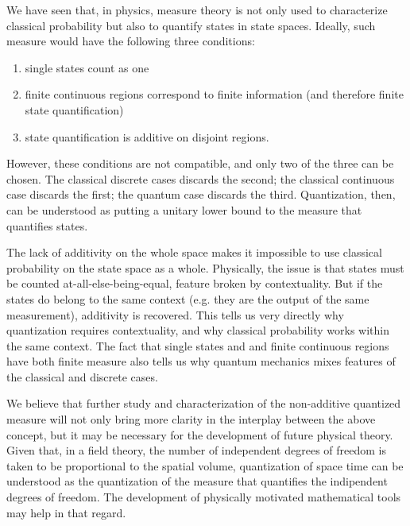 \documentclass[10pt,twocolumn, nofootinbib]{revtex4-2}
\begin{document}
We have seen that, in physics, measure theory is not only used to characterize classical probability but also to quantify states in state spaces. Ideally, such measure would have the following three conditions:
\begin{enumerate}
	\item single states count as one
	\item finite continuous regions correspond to finite information (and therefore finite state quantification)
	\item state quantification is additive on disjoint regions.
\end{enumerate}
However, these conditions are not compatible, and only two of the three can be chosen. The classical discrete cases discards the second; the classical continuous case discards the first; the quantum case discards the third. Quantization, then, can be understood as putting a unitary lower bound to the measure that quantifies states.

The lack of additivity on the whole space makes it impossible to use classical probability on the state space as a whole. Physically, the issue is that states must be counted at-all-else-being-equal, feature broken by contextuality. But if the states do belong to the same context (e.g. they are the output of the same measurement), additivity is recovered. This tells us very directly why quantization requires contextuality, and why classical probability works within the same context. The fact that single states and and finite continuous regions have both finite measure also tells us why quantum mechanics mixes features of the classical and discrete cases.

We believe that further study and characterization of the non-additive quantized measure will not only bring more clarity in the interplay between the above concept, but it may be necessary for the development of future physical theory. Given that, in a field theory, the number of independent degrees of freedom is taken to be proportional to the spatial volume, quantization of space time can be understood as the quantization of the measure that quantifies the indipendent degrees of freedom. The development of physically motivated mathematical tools may help in that regard.



\newcommand{\pj}[1] {\underbar{$#1$}}
\end{document}
